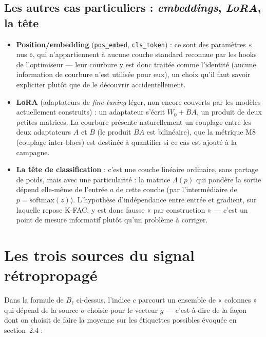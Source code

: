 \documentclass[11pt,a4paper]{article}
\newcommand{\eng}[1]{\emph{#1}}
\begin{document}
\subsection{Les autres cas particuliers : \eng{embeddings}, \eng{LoRA}, la tête}

\begin{itemize}
\item \textbf{Position/embedding} (\texttt{pos\_embed}, \texttt{cls\_token}) : ce sont des paramètres
« nus », qui n'appartiennent à aucune couche standard reconnue par les hooks de l'optimiseur — leur
courbure y est donc traitée comme l'identité (aucune information de courbure n'est utilisée pour
eux), un choix qu'il faut savoir expliciter plutôt que de le découvrir accidentellement.
\item \textbf{LoRA} (adaptateurs de \eng{fine-tuning} léger, non encore couverts par les modèles
actuellement construits) : un adaptateur s'écrit $W_0+BA$, un produit de deux petites matrices. La
courbure présente naturellement un couplage entre les deux adaptateurs $A$ et $B$ (le produit $BA$
est bilinéaire), que la métrique M8 (couplage inter-blocs) est destinée à quantifier si ce cas est
ajouté à la campagne.
\item \textbf{La tête de classification} : c'est une couche linéaire ordinaire, sans partage de
poids, mais avec une particularité : la matrice $\Lambda(p)$ qui pondère la sortie dépend
elle-même de l'entrée $a$ de cette couche (par l'intermédiaire de $p=\mathrm{softmax}(z)$).
L'hypothèse d'indépendance entre entrée et gradient, sur laquelle repose K-FAC, y est donc fausse
« par construction » — c'est un point de mesure informatif plutôt qu'un problème à corriger.
\end{itemize}

\section{Les trois sources du signal rétropropagé}
\label{sec:sources}

Dans la formule de $B_\ell$ ci-dessus, l'indice $c$ parcourt un ensemble de « colonnes » qui dépend
de la source $\sigma$ choisie pour le vecteur $g$ — c'est-à-dire de la façon dont on choisit de faire
la moyenne sur les étiquettes possibles évoquée en section~2.4 :
\end{document}
